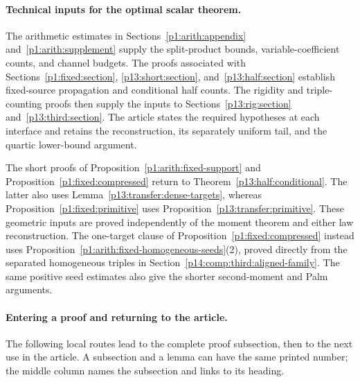 \paragraph{Technical inputs for the optimal scalar theorem.}
The arithmetic estimates in Sections~\ref{p1:arith:appendix}
and~\ref{p1:arith:supplement} supply the split-product bounds,
variable-coefficient counts, and channel budgets. The proofs
associated with Sections~\ref{p1:fixed:section},
\ref{p13:short:section}, and~\ref{p13:half:section} establish
fixed-source propagation and conditional half counts. The
rigidity and triple-counting proofs then supply the inputs to
Sections~\ref{p13:rig:section} and~\ref{p13:third:section}.
The article states the required hypotheses at each interface
and retains the reconstruction, its separately uniform tail,
and the quartic lower-bound argument.

The short proofs of Proposition~\ref{p1:arith:fixed-support} and
Proposition~\ref{p1:fixed:compressed} return to
Theorem~\ref{p13:half:conditional}. The latter also uses
Lemma~\ref{p13:transfer:dense-targets}, whereas
Proposition~\ref{p1:fixed:primitive} uses
Proposition~\ref{p13:transfer:primitive}. These geometric inputs
are proved independently of the moment theorem and either law reconstruction.
The one-target clause of Proposition~\ref{p1:fixed:compressed} instead
uses Proposition~\ref{p1:arith:fixed-homogeneous-seeds}(2), proved directly
from the separated homogeneous triples in
Section~\ref{p14:comp:third:aligned-family}. The same positive seed
estimates also give the shorter second-moment and Palm arguments.

\paragraph{Entering a proof and returning to the article.}
The following local routes lead to the complete proof subsection,
then to the next use in the article. A subsection and a lemma can
have the same printed number; the middle column names the
subsection and links to its heading.

